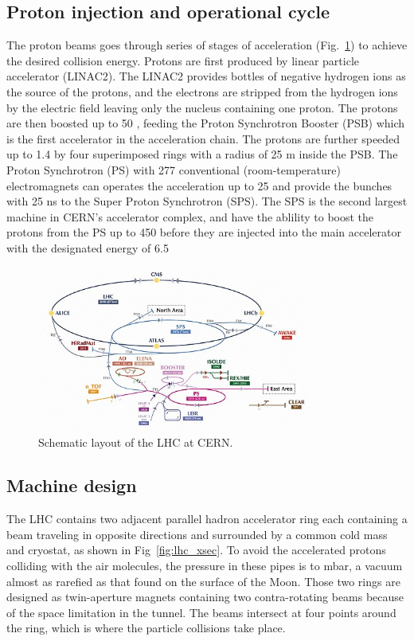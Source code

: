 \subsection{Proton injection and operational cycle}
The proton beams goes through series of stages of acceleration (Fig.~\ref{fig:lhc_layout}) to achieve the desired collision energy.
Protons are first produced by linear particle accelerator (LINAC2).
The LINAC2 provides bottles of negative hydrogen ions as the source of the protons, and the electrons are stripped from the hydrogen ions by the electric field leaving only the nucleus containing one proton.
The protons are then boosted up to 50 \MeV, feeding the Proton Synchrotron Booster (PSB) which is the first accelerator in the acceleration chain.
The protons are further speeded up to 1.4 \GeV by four superimposed rings with a radius of 25 m inside the PSB.
The Proton Synchrotron (PS) with 277 conventional (room-temperature) electromagnets can operates the acceleration up to 25 \GeV and provide the bunches with 25 ns to the Super Proton Synchrotron (SPS).
The SPS is the second largest machine in CERN’s accelerator complex, and have the ablility to boost the protons from the PS up to 450 \GeV before they are injected into the main accelerator with the designated energy of 6.5 \GeV
\begin{figure}\centering
    \includegraphics[width=0.8\textwidth]{figure/lhc_layout.jpeg}
    \caption{Schematic layout of the LHC at CERN.}
    \label{fig:lhc_layout}
\end{figure}

\subsection{Machine design}
The LHC contains two adjacent parallel hadron accelerator ring each containing a beam traveling in opposite directions and surrounded by a common cold mass and cryostat, as shown in Fig~\ref{fig:lhc_xsec}.
To avoid the accelerated protons colliding with the air molecules, the pressure in these pipes is  to  mbar, a vacuum almost as rarefied as that found on the surface of the Moon.
Those two rings are designed as twin-aperture magnets containing two contra-rotating beams because of the space limitation in the tunnel.
The beams intersect at four points around the ring, which is where the particle collisions take place.


